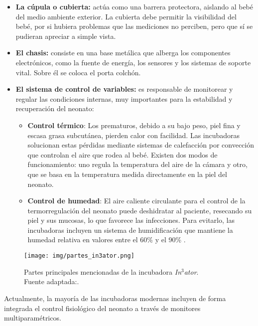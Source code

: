 \begin{itemize}
    \item \textbf{La cúpula o cubierta:} actúa como una barrera protectora, aislando al bebé del medio ambiente exterior. La cubierta debe permitir la visibilidad del bebé, por si hubiera problemas que las mediciones no perciben, pero que sí se pudieran apreciar a simple vista.
    \item \textbf{El chasis:} consiste en una base metálica que alberga los componentes electrónicos, como la fuente de energía, los sensores y los sistemas de soporte vital. Sobre él se coloca el porta colchón. 
    \item \textbf{El sistema de control de variables:} es responsable de monitorear y regular las condiciones internas, muy importantes para la estabilidad y recuperación del neonato:
    \begin{itemize}
        \item \textbf{Control térmico}: Los prematuros, debido a su bajo peso, piel fina y escasa grasa subcutánea, pierden calor con facilidad. Las incubadoras solucionan estas pérdidas mediante sistemas de calefacción por convección que controlan el aire que rodea al bebé. Existen dos modos de funcionamiento: uno regula la temperatura del aire de la cámara y otro, que se basa en la temperatura medida directamente en la piel del neonato.
        \item \textbf{Control de humedad}: El aire caliente circulante para el control de la termorregulación del neonato puede deshidratar al paciente, resecando su piel y sus mucosas, lo que favorece las infecciones. Para evitarlo, las incubadoras incluyen un sistema de humidificación que mantiene la humedad relativa en valores entre el 60\% y el 90\% \cite{restrepo2007incubadora}.
    \end{itemize}
\end{itemize} 

\begin{figure}[H]
    \centering
    \texttt{[image: img/partes\_in3ator.png]}
    \caption{Partes principales mencionadas de la incubadora \textit{In$^3$ator}. 
    \\ Fuente adaptada:\cite{in3es2025}. }
    \label{fig:partes_in3ator}
\end{figure}

Actualmente, la mayoría de las incubadoras modernas incluyen de forma integrada el control fisiológico del neonato a través de monitores multiparamétricos. 

